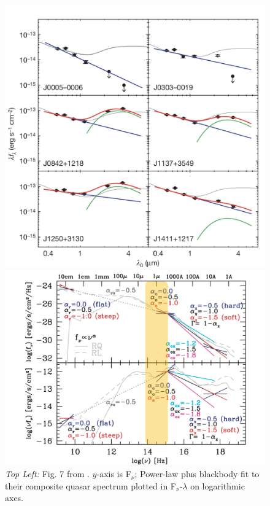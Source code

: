 \documentclass[11pt,a4paper]{article}
\begin{document}
\begin{figure}
\begin{multicols}{2}
    \includegraphics[width=\linewidth]{Jiang_2010_Nature_464_380_Fig1.jpeg}\par
\end{multicols}
    \includegraphics[width=\linewidth]{Richards_2006_ApJS_166_470_Fig10_bottomhalf.pdf}\par
\caption{
{\it Top Left:} Fig. 7 from \citet{Glikman2006}. $y$-axis is F$_{\nu}$; 
Power-law plus blackbody fit to their composite quasar spectrum plotted in F$_{\nu}$-$\lambda$ on logarithmic axes. 
}
\end{figure}
\end{document}
